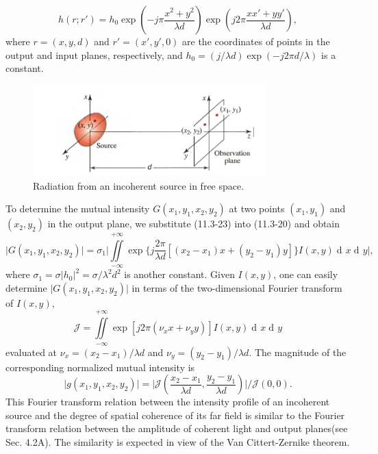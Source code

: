\documentclass{article}
\numberwithin{figure}{subsection}
\numberwithin{table}{subsection}
\DeclareMathOperator\dif{d\!}
\begin{document}
\begin{equation}
h(r; r') = h_0 \exp (-j\pi \frac{x^2 + y^2}{\lambda d}) \exp (j2\pi \frac{xx' + yy'}{\lambda d}),
\end{equation}
where $r = (x,y,d)$ and $r' = (x', y', 0)$ are the coordinates of points in the output and input planes, respectively, and $h_0 = (j / \lambda d) \exp(-j2\pi d / \lambda)$ is a constant.
\begin{figure}[H]
\centering
\includegraphics[width=0.8\textwidth]{11_3_7.PNG}
\caption{Radiation from an incoherent source in free space.}
\label{fig: 11_3_7}
\end{figure}
\par To determine the mutual intensity $G(x_1, y_1, x_2, y_2)$ at two points $(x_1, y_1)$ and $(x_2, y_2)$ in the output plane, we substitute (11.3-23) into (11.3-20) and obtain
\begin{equation}
\lvert G(x_1, y_1, x_2, y_2) \rvert = \sigma_1 \bigg\lvert \iint\limits_{-\infty}^{+\infty} \exp \{j\frac{2\pi}{\lambda d} [(x_2 - x_1)x + (y_2 - y_1)y]\}I(x,y) \dif x \dif y \bigg\rvert ,
\end{equation}
where $\sigma_1 = \sigma \lvert h_0 \rvert ^2 = \sigma / \lambda ^2 d^2$ is another constant. Given $I(x,y)$, one can easily determine $\lvert G(x_1, y_1, x_2, y_2) \rvert$ in terms of the two-dimensional Fourier transform of $I(x,y)$,
\begin{equation}
\mathcal{J} = \iint\limits_{-\infty}^{+\infty}\exp [j2\pi (\nu_x x+ \nu_y y)] I(x,y) \dif x \dif y
\end{equation}
evaluated at $\nu_x = (x_2 - x_1) / \lambda d$ and $\nu_y = (y_2 - y_1) / \lambda d$. The magnitude of the corresponding normalized mutual intensity is
\begin{equation}
\lvert g(x_1, y_1, x_2, y_2) \rvert = \bigg\lvert \mathcal{J}(\frac{x_2 - x_1}{\lambda d}, \frac{y_2 - y_1}{\lambda d}) \bigg\rvert / \mathcal{J}(0, 0) .
\end{equation}
This Fourier transform relation between the intensity profile of an incoherent source and the degree of spatial coherence of its far field is similar to the Fourier transform relation between the amplitude of coherent light and output  planes(see Sec. 4.2A). The similarity is expected in view of the Van Cittert-Zernike theorem.
\end{document}

